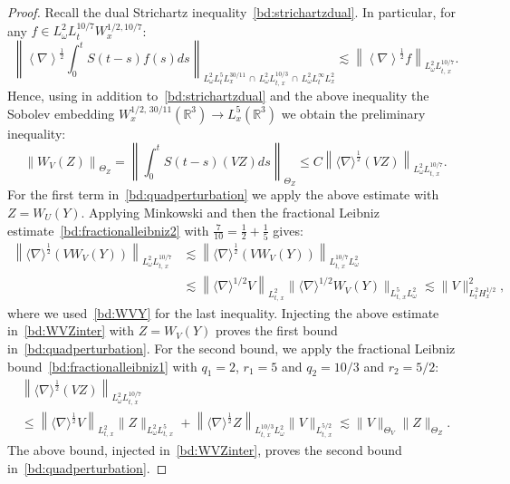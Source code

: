 \documentclass[10pt]{amsart}
\theoremstyle{definition}\newtheorem{defi}[theo]{Definition}\newtheorem{rema}[theo]{Remark}\newtheorem{exam}[theo]{Example}\newtheorem{exem}[theo]{Example}\newtheorem{nota}[theo]{Notation}
\newcommand{\R}{\mathbb{R}}
\begin{document}
\begin{proof}
Recall the dual Strichartz inequality~\eqref{bd:strichartzdual}. In particular, for any $f\in L^2_\omega L^{10/7}_tW^{1/2,10/7}_x$:
\[
\left\| \left\langle \nabla \right\rangle^{\frac 12}\int_0^t S(t-s)f(s)ds\right\|_{L^2_\omega L^{5}_tL^{30/11}_x\,\cap\,L^2_\omega L^{10/3}_{t,\,x}\,\cap\,L^2_\omega L^{\infty}_t L^2_x}\lesssim \left\| \left\langle \nabla \right\rangle^{\frac 12}f \right\|_{ L^2_\omega L^{10/7}_{t,\,x}}.
\]
Hence, using in addition to~\eqref{bd:strichartzdual} and the above inequality the Sobolev embedding $W^{1/2,\,30/11}_x(\R^3)\rightarrow L^5_x(\R^3)$ we obtain the preliminary inequality:
\begin{equation} \label{bd:WVZinter}
\left\|W_V (Z)\right\|_{\Theta_Z}=\left\|\int_0^t S(t-s)(VZ)ds\right\|_{\Theta_Z} \leq C \left\| \langle \nabla \rangle^{\frac 12} (V Z)\right\|_{L^2_\omega L^{10/7}_{t,\,x}}.
\end{equation}
For the first term in~\eqref{bd:quadperturbation} we apply the above estimate with $Z=W_U(Y)$. Applying Minkowski and then the fractional Leibniz estimate~\eqref{bd:fractionalleibniz2} with $\tfrac7{10} = \tfrac12 + \tfrac15$ gives:
\begin{align*}
\left\| \langle \nabla \rangle^{\frac 12} \left(V W_V (Y)\right)\right\|_{L^2_\omega L^{10/7}_{t,\,x}}&\lesssim \left\| \langle \nabla \rangle^{\frac 12} \left(V W_V (Y)\right)\right\|_{L^{10/7}_{t,\,x}L^2_\omega} \\
&\lesssim \left\| \langle \nabla \rangle^{1/2} V \right\|_{L^2_{t,\,x}}\| \langle \nabla \rangle^{1/2} W_V (Y) \|_{L^5_{t,\,x}L^2_\omega} \lesssim \| V \|_{L^2_tH^{1/2}_x}^2,
\end{align*}
where we used~\eqref{bd:WVY} for the last inequality. Injecting the above estimate in~\eqref{bd:WVZinter} with $Z=W_V(Y)$ proves the first bound in~\eqref{bd:quadperturbation}. For the second bound, we apply the fractional Leibniz bound~\eqref{bd:fractionalleibniz1} with $q_1=2$, $r_1=5$ and $q_2=10/3$ and $r_2=5/2$:
\begin{multline*}
\left\| \langle \nabla \rangle^{\frac 12} (V Z)\right\|_{L^2_\omega L^{10/7}_{t,\,x}}\\
\leq \left\| \langle \nabla \rangle^{\frac 12} V \right\|_{L^{2}_{t,\,x}}\| Z \|_{L^2_\omega L^{5}_{t,\,x}}+\left\| \langle \nabla \rangle^{\frac 12} Z \right\|_{L^{10/3}_{t,\,x}L^2_\omega}\| V \|_{L^{5/2}_{t,\,x}}\lesssim \| V \|_{\Theta_V}\| Z\|_{\Theta_Z}.
\end{multline*}
The above bound, injected in~\eqref{bd:WVZinter}, proves the second bound in~\eqref{bd:quadperturbation}.
\end{proof}
\end{document}
